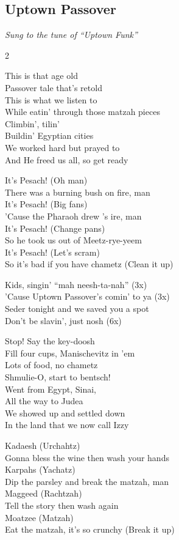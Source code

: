 \pagebreak
\subsection*{Uptown Passover}
\textit{Sung to the tune of ``Uptown Funk''}

\begin{multicols}{2}

This is that age old \\
Passover tale that's retold \\
This is what we listen to \\
While eatin' through those matzah pieces \\
Climbin', tilin' \\
Buildin' Egyptian cities \\
We worked hard but prayed to {\god} \\
And He freed us all, so get ready

It's Pesach! (Oh man) \\
There was a burning bush on fire, man \\
It's Pesach! (Big fans) \\
'Cause the Pharaoh drew {\god}'s ire, man \\
It's Pesach! (Change pans) \\
So he took us out of Meetz-rye-yeem \\
It's Pesach! (Let's scram) \\
So it's bad if you have chametz (Clean it up)

Kids, singin' ``mah neesh-ta-nah'' (3x) \\
'Cause Uptown Passover's comin' to ya (3x) \\
Seder tonight and we saved you a spot \\
Don't be slavin', just nosh (6x)

Stop! Say the key-doosh \\
Fill four cups, Manischevitz in 'em \\
Lots of food, no chametz \\
Shmulie-O, start to bentsch! \\
Went from Egypt, Sinai, \\
All the way to Judea \\
We showed up and settled down \\
In the land that we now call Izzy

Kadaesh (Urchahtz) \\
Gonna bless the wine then wash your hands \\
Karpahs (Yachatz) \\
Dip the parsley and break the matzah, man \\
Maggeed (Rachtzah) \\
Tell the story then wash again \\
Moatzee (Matzah) \\
Eat the matzah, it's so crunchy (Break it up)


\end{multicols}
